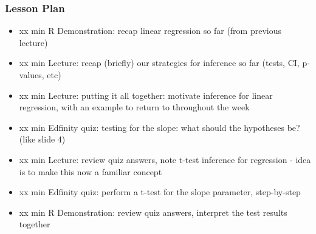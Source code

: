 \begin{frame}
    \frametitle{Lesson Plan}
    \begin{itemize}
        \item xx min R Demonstration: recap linear regression so far (from previous lecture)
        \item xx min Lecture: recap (briefly) our strategies for inference so far (tests, CI, p-values, etc)
        \item xx min Lecture: putting it all together: motivate inference for linear regression, with an example to return to throughout the week
        \item xx min Edfinity quiz: testing for the slope: what should the hypotheses be? (like slide 4)
        \item xx min Lecture: review quiz answers, note t-test inference for regression - idea is to make this now a familiar concept
        \item xx min Edfinity quiz: perform a t-test for the slope parameter, step-by-step
        \item xx min R Demonstration: review quiz answers, interpret the test results together
    \end{itemize}
\end{frame}


